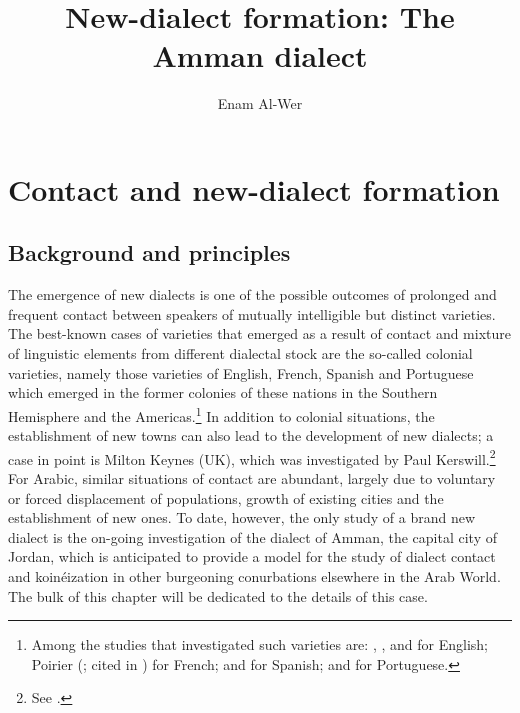\documentclass[output=paper]{langsci/langscibook}
\author{Enam Al-Wer\affiliation{University of Essex}}
\title{New-dialect formation: The Amman dialect}
\begin{document}
\maketitle 

\section{Contact and new-dialect formation} \label{new}


\subsection{Background and principles}

The emergence of new dialects is one of the possible outcomes of prolonged and frequent contact between speakers of mutually intelligible but distinct varieties. The best-known cases of varieties that emerged as a result of contact and mixture of linguistic elements from different dialectal stock are the so-called colonial varieties, namely those varieties of English, French, Spanish and Portuguese which emerged in the former colonies of these nations in the Southern Hemisphere and the Americas.\footnote{Among the studies that investigated such varieties are: \citet{Trudgill2004}, \citet{GordonEtAl2004}, \citet{Sudbury2000} and \citet{Schreier2003} for English; Poirier (\citeyear{Poirier1994}; cited in \citealt{Trudgill2004}) for French; \citet{Lipski1994} and \citet{Penny2000} for Spanish; and \citet{Mattoso1972} for Portuguese.} In addition to colonial situations, the establishment of new towns can also lead to the development of new dialects; a case in point is Milton Keynes (UK), which was investigated by Paul Kerswill.\footnote{See \citet{KerswillWilliams2005}.} For Arabic, similar situations of contact are abundant, largely due to voluntary or forced displacement of populations, growth of existing cities and the establishment of new ones. To date, however, the only study of a brand new dialect is the on-going investigation of the dialect of Amman, the capital city of Jordan, which is anticipated to provide a model for the study of dialect contact and koinéization in other burgeoning conurbations elsewhere in the Arab World. The bulk of this chapter will be dedicated to the details of this case.
\end{document}
